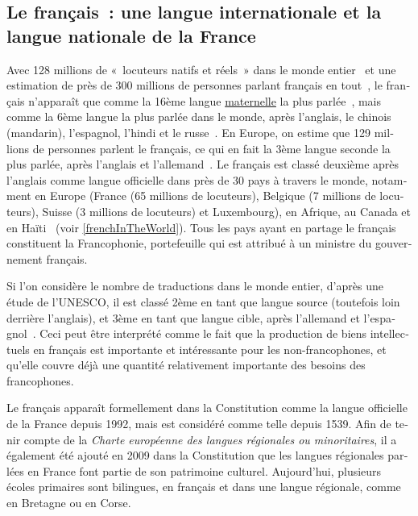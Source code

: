 \begin{french}
\clearpage



\begin{multicols}{2}

\subsection{Le français~: une langue internationale et la langue nationale de la France}
Avec 128 millions de «~locuteurs natifs et réels~» dans le monde
entier~\cite{native} et une estimation de près de 300 millions de
personnes parlant français en tout~\cite{francais}, le français
n'apparaît que comme la 16ème langue \underline{maternelle} la plus
parlée~\cite{Lewis2009}, mais comme la 6ème langue la plus parlée dans
le monde, après l'anglais, le chinois (mandarin), l'espagnol, l'hindi et
le russe~\cite{russe}. En Europe, on estime que 129 millions de
personnes parlent le français, ce qui en fait la 3ème langue seconde la
plus parlée, après l'anglais et l'allemand~\cite{francais}. Le français est classé
deuxième après l'anglais comme langue officielle dans près de 30 pays
à travers le monde, notamment en Europe (France (65 millions de
locuteurs), Belgique (7 millions de locuteurs), Suisse (3 millions de
locuteurs) et Luxembourg), en Afrique, au Canada et en
Haïti~\cite{haiti} (voir \ref{frenchInTheWorld}). Tous les pays ayant en partage le
français constituent la Francophonie, portefeuille qui est attribué à
un ministre du gouvernement français.

Si l'on considère le nombre de traductions dans le monde
entier, d'après une étude de l'UNESCO, il est classé 2ème en
tant que langue source (toutefois loin derrière l'anglais), et
3ème en tant que langue cible, après l'allemand et l'espagnol~\cite{espagnol}. Ceci peut être interprété comme le fait
que la production de biens intellectuels en français est importante et
intéressante pour les non-francophones, et qu'elle couvre déjà
une quantité relativement importante des besoins des francophones.

Le français apparaît formellement dans la Constitution comme la langue
officielle de la France depuis 1992, mais est considéré comme telle
depuis 1539. Afin de tenir compte de la {\em Charte européenne des langues
régionales ou minoritaires}, il a également été ajouté en 2009 dans la
Constitution que les langues régionales parlées en France font partie
de son patrimoine culturel. Aujourd'hui, plusieurs écoles primaires
sont bilingues, en français et dans une langue régionale, comme en
Bretagne ou en Corse.


\end{multicols}
\end{french}
